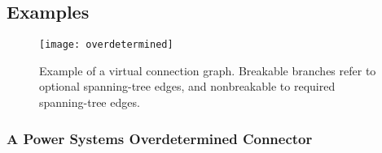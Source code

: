 \subsection{Examples}\label{examples-of-overconstrained-connectors}

\begin{example}
\begin{figure}[H]
  \begin{center}
    \texttt{[image: overdetermined]}
  \end{center}
  \caption{%
  Example of a virtual connection graph.
  Breakable branches refer to optional spanning-tree edges, and nonbreakable to required spanning-tree edges.
   }
\end{figure}
\end{example}

\subsubsection{A Power Systems Overdetermined Connector}\label{an-overdetermined-connector-for-power-systems}\label{a-power-systems-overdetermined-connector}

